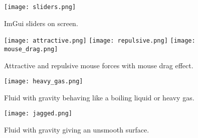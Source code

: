 \documentclass[write-up.tex]{subfiles}
\begin{document}
\begin{appendices}
\begin{figure}[h]
\centering
\texttt{[image: sliders.png]}
\caption{ImGui sliders on screen.}
\label{fig:sliders}
\end{figure}

\begin{figure}[h]
\centering
\texttt{[image: attractive.png]}
\texttt{[image: repulsive.png]}
\texttt{[image: mouse\_drag.png]}
\caption{Attractive and repulsive mouse forces with mouse drag effect.}
\label{fig:mouse_forces}
\end{figure}

\begin{figure}[h]
\centering
\texttt{[image: heavy\_gas.png]}
\caption{Fluid with gravity behaving like a boiling liquid or heavy gas.}
\label{fig:heavy_gas}
\end{figure}

\begin{figure}[h]
\centering
\texttt{[image: jagged.png]}
\caption{Fluid with gravity giving an unsmooth surface.}
\label{fig:jagged}
\end{figure}

\end{appendices}
\end{document}
